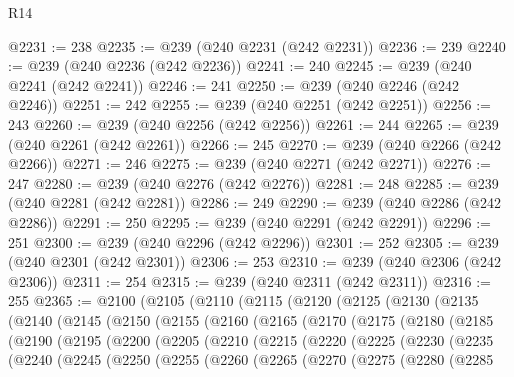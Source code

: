 \begin{lexlean}{R14}
\begin{coremodule}
{{{{{{{{{{{{{{{{{{{{{{{{{{{{{{{{{{{{{{{{{{{{{{{{{{{{{{{{{{{{{{{{{{{{{{{{{{{{{{{{{{{{{{{{{{{{{{{{{{{{{{{{{{@2231 := 238
@2235 := @239 (@240 @2231 (@242 @2231))
@2236 := 239
@2240 := @239 (@240 @2236 (@242 @2236))
@2241 := 240
@2245 := @239 (@240 @2241 (@242 @2241))
@2246 := 241
@2250 := @239 (@240 @2246 (@242 @2246))
@2251 := 242
@2255 := @239 (@240 @2251 (@242 @2251))
@2256 := 243
@2260 := @239 (@240 @2256 (@242 @2256))
@2261 := 244
@2265 := @239 (@240 @2261 (@242 @2261))
@2266 := 245
@2270 := @239 (@240 @2266 (@242 @2266))
@2271 := 246
@2275 := @239 (@240 @2271 (@242 @2271))
@2276 := 247
@2280 := @239 (@240 @2276 (@242 @2276))
@2281 := 248
@2285 := @239 (@240 @2281 (@242 @2281))
@2286 := 249
@2290 := @239 (@240 @2286 (@242 @2286))
@2291 := 250
@2295 := @239 (@240 @2291 (@242 @2291))
@2296 := 251
@2300 := @239 (@240 @2296 (@242 @2296))
@2301 := 252
@2305 := @239 (@240 @2301 (@242 @2301))
@2306 := 253
@2310 := @239 (@240 @2306 (@242 @2306))
@2311 := 254
@2315 := @239 (@240 @2311 (@242 @2311))
@2316 := 255
@2365 := @2100
    (@2105
      (@2110
        (@2115
          (@2120
            (@2125
              (@2130
                (@2135
                  (@2140
                    (@2145
                      (@2150
                        (@2155
                          (@2160
                            (@2165
                              (@2170
                                (@2175
                                  (@2180
                                    (@2185
                                      (@2190
                                        (@2195
                                          (@2200
                                            (@2205
                                              (@2210
                                                (@2215
                                                  (@2220
                                                    (@2225
                                                      (@2230
                                                        (@2235
                                                          (@2240
                                                            (@2245
                                                              (@2250
                                                                (@2255
                                                                  (@2260
                                                                    (@2265
                                                                      (@2270
                                                                        (@2275
                                                                          (@2280
                                                                            (@2285
}}}}}}}}}}}}}}}}}}}}}}}}}}}}}}}}}}}}}}}}}}}}}}}}}}}}}}}}}}}}}}}}}}}}}}}}}}}}}}}}}}}}}}}}}}}}}}}}}}}}}}}}}}
\end{coremodule}
\end{lexlean}
